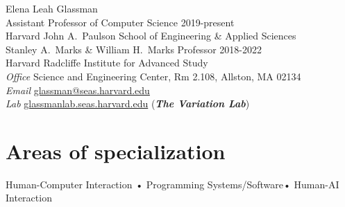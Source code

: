\documentclass[10pt, a4paper]{article}
\begin{document}
{\LARGE Elena Leah Glassman}\\[0.25cm]
{\large Assistant Professor of Computer Science \hfill 2019-present\\ 
Harvard John A.~Paulson School of Engineering \& Applied Sciences\\
[0.1cm]
Stanley A.~Marks \& William H.~Marks Professor \hfill 2018-2022 \\
Harvard Radcliffe Institute for Advanced Study}\\[0.4cm]
\textit{Office} Science and Engineering Center, Rm 2.108, Allston, MA 02134\\%
\textit{Email} \href{mailto:glassman@seas.harvard.edu}{glassman@seas.harvard.edu} \\
\textit{Lab} \href{http://glassmanlab.seas.harvard.edu/}{glassmanlab.seas.harvard.edu} (\textit{\textbf{The Variation Lab}})

\section*{Areas of specialization}
Human-Computer Interaction • Programming Systems/Software• Human-AI Interaction
\end{document}
